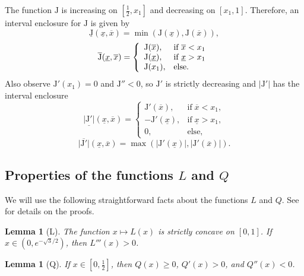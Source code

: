 \documentclass[11pt]{amsart}
\theoremstyle{plain}
\newtheorem{lemma}[thm]{Lemma}
\theoremstyle{definition}
\theoremstyle{remark}
\numberwithin{equation}{section}
\begin{document}
The function ${\mathrm{J}}$ is increasing on $[\tfrac{1}{2},x_1]$ and decreasing on $[x_1,1]$. Therefore, an interval enclosure for ${\mathrm{J}}$ is given by
\begin{equation}
\label{eqn:J_intencl}
\underline{{\mathrm{J}}}(\underline{x},\overline{x}) = \min({\mathrm{J}}(\underline{x}),{\mathrm{J}}(\overline{x})),
\end{equation}
\[\overline{{\mathrm{J}}}(\underline{x},\overline{x}) = \left\{ \begin{array}{ll}
{\mathrm{J}}(\overline{x}),& \textup{if } \overline{x}<x_1 \\
{\mathrm{J}}(\underline{x}), & \textup{if } \underline{x}>x_1\\
{\mathrm{J}}(x_1),&\textup{else.}
\end{array}\right.\]
Also observe ${\mathrm{J}}'(x_1)=0$ and ${\mathrm{J}}''<0$, so ${\mathrm{J}}'$ is strictly decreasing and $|{\mathrm{J}}'|$ has the interval enclosure
\[ \underline{|{\mathrm{J}}'|}(\underline{x},\overline{x})= \left\{
\begin{array}{ll}
{\mathrm{J}}'(\overline{x}), & \text{if}\;\overline{x}<x_1,\\
-{\mathrm{J}}'(\underline{x}), & \text{if}\;\underline{x}>x_1,\\
0, & \text{else,}
\end{array}
\right.\]
\[ \overline{|{\mathrm{J}}'|}(\underline{x},\overline{x}) = \max(|{\mathrm{J}}'(\underline{x})|, |{\mathrm{J}}'(\overline{x})|). \]

\subsection{\texorpdfstring{Properties of the functions $L$ and $Q$}{Properties of the functions L and Q}}
We will use the following straightforward facts about the functions $L$ and $Q$. See \cite[Lemma 5.6, Lemma 5.8]{DIR24} for details on the proofs.
\begin{lemma}[L]\label{lem:L}
The function $x\mapsto L(x)$ is strictly concave on $[0,1]$. If $x\in (0,e^{-\sqrt{3}/2})$, then $L'''(x)>0$.
\end{lemma}

\begin{lemma}[Q]
\label{lem:Q}
If $x\in [0,\tfrac12]$, then
$Q(x)\ge 0$, $Q'(x)>0$, and $Q''(x)<0$.
\end{lemma}
\end{document}
